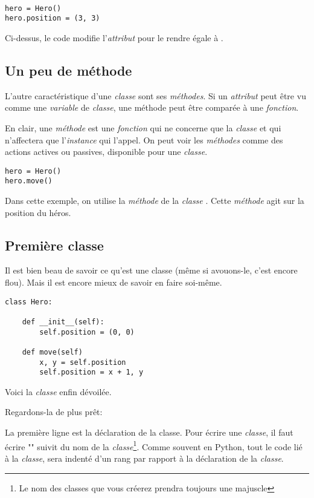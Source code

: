 \begin{lstlisting}

hero = Hero()
hero.position = (3, 3)

\end{lstlisting}

Ci-dessus, le code modifie l'\emph{attribut}  pour le rendre égale à .

\subsection{Un peu de méthode}

L'autre caractéristique d'une \emph{classe} sont ses \emph{méthodes}.
Si un \emph{attribut} peut être vu comme une \emph{variable} de \emph{classe}, une méthode peut être comparée à une \emph{fonction}.

En clair, une \emph{méthode} est une \emph{fonction} qui ne concerne que la \emph{classe} et qui n'affectera que l'\emph{instance} qui l'appel.
On peut voir les \emph{méthodes} comme des actions actives ou passives, disponible pour une \emph{classe}.

\begin{lstlisting}
hero = Hero()
hero.move()
\end{lstlisting}

Dans cette exemple, on utilise la \emph{méthode}  de la \emph{classe} .
Cette \emph{méthode} agit sur la position du héros.

\pagebreak
\subsection{Première classe}

Il est bien beau de savoir ce qu'est une classe (même si avouons-le, c'est encore flou). Mais il est encore mieux de savoir en faire soi-même.

\begin{lstlisting}
class Hero:

	def __init__(self):
		self.position = (0, 0)
		
	def move(self)
		x, y = self.position
		self.position = x + 1, y
\end{lstlisting}

Voici la \emph{classe}  enfin dévoilée.

Regardons-la de plus prêt:

La première ligne est la déclaration de la classe.
Pour écrire une \emph{classe}, il faut écrire "" suivit du nom de la \emph{classe}\footnote{Le nom des classes que vous créerez prendra toujours une majuscle}.
Comme souvent en Python, tout le code lié à la \emph{classe}, sera indenté d'un rang par rapport à la déclaration de la \emph{classe}.


